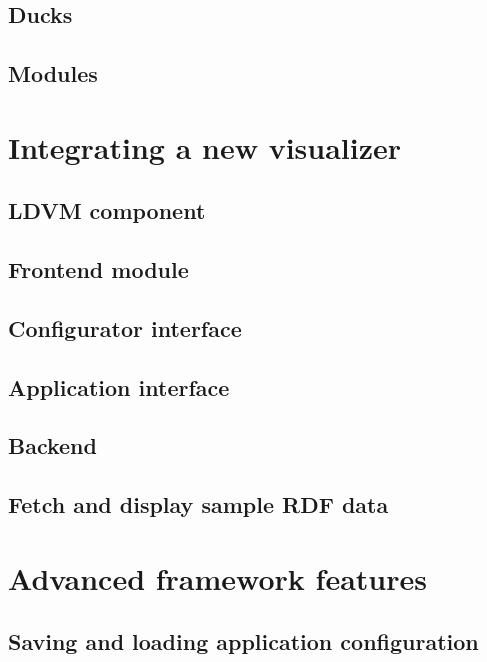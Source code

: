 \subsection{Ducks}

\subsection{Modules}



\section{Integrating a new visualizer}

\subsection{LDVM component}

\subsection{Frontend module}

\subsection{Configurator interface}

\subsection{Application interface}

\subsection{Backend}

\subsection{Fetch and display sample RDF data}



\section{Advanced framework features}

\subsection{Saving and loading application configuration}

